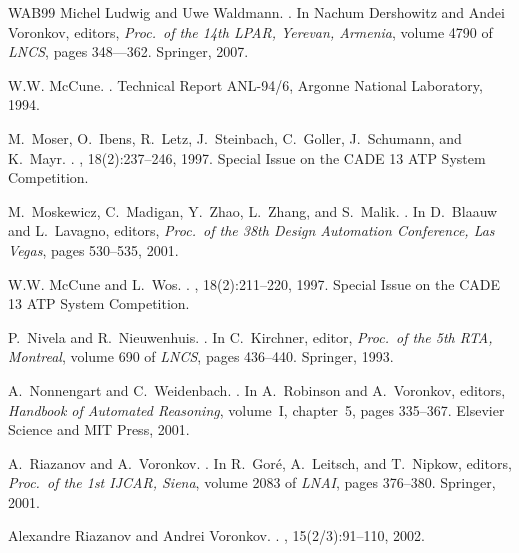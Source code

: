 \documentclass{report}
\begin{document}
\begin{thebibliography}{WAB{\etalchar{+}}99}
Michel Ludwig and Uwe Waldmann.
.
\newblock In Nachum Dershowitz and Andei Voronkov, editors, {\em Proc.\ of the
  14th LPAR, Yerevan, Armenia}, volume 4790 of {\em LNCS}, pages 348–--362.
  Springer, 2007.

W.W. McCune.
.
\newblock Technical Report ANL-94/6, Argonne National Laboratory, 1994.

M.~Moser, O.~Ibens, R.~Letz, J.~Steinbach, C.~Goller, J.~Schumann, and K.~Mayr.
.
, 18(2):237--246, 1997.
\newblock Special Issue on the CADE 13 ATP System Competition.

M.~Moskewicz, C.~Madigan, Y.~Zhao, L.~Zhang, and S.~Malik.
.
\newblock In D.~Blaauw and L.~Lavagno, editors, {\em Proc.\ of the 38th Design
  Automation Conference, Las Vegas}, pages 530--535, 2001.

W.W. McCune and L.~Wos.
.
, 18(2):211--220, 1997.
\newblock Special Issue on the CADE 13 ATP System Competition.

P.~Nivela and R.~Nieuwenhuis.
.
\newblock In C.~Kirchner, editor, {\em Proc.\ of the 5th RTA, Montreal}, volume
  690 of {\em LNCS}, pages 436--440. Springer, 1993.

A.~Nonnengart and C.~Weidenbach.
.
\newblock In A.~Robinson and A.~Voronkov, editors, {\em Handbook of Automated
  Reasoning}, volume~I, chapter~5, pages 335--367. Elsevier Science and MIT
  Press, 2001.

A.~Riazanov and A.~Voronkov.
.
\newblock In R.~Gor{\'e}, A.~Leitsch, and T.~Nipkow, editors, {\em Proc.\ of
  the 1st IJCAR, Siena}, volume 2083 of {\em LNAI}, pages 376--380. Springer,
  2001.

Alexandre Riazanov and Andrei Voronkov.
.
, 15(2/3):91--110, 2002.


\end{thebibliography}
\end{document}
